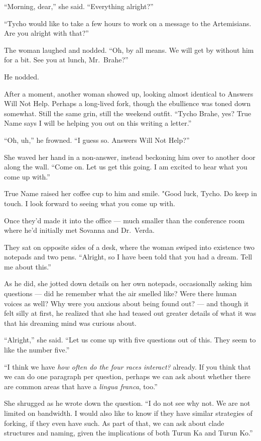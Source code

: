 ``Morning, dear,'' she said. ``Everything alright?''

``Tycho would like to take a few hours to work on a message to the Artemisians. Are you alright with that?''

The woman laughed and nodded. ``Oh, by all means. We will get by without him for a bit. See you at lunch, Mr.~Brahe?''

He nodded.

After a moment, another woman showed up, looking almost identical to Answers Will Not Help. Perhaps a long-lived fork, though the ebullience was toned down somewhat. Still the same grin, still the weekend outfit. ``Tycho Brahe, yes? True Name says I will be helping you out on this writing a letter.''

``Oh, uh,'' he frowned. ``I guess so. Answers Will Not Help?''

She waved her hand in a non-answer, instead beckoning him over to another door along the wall. ``Come on. Let us get this going. I am excited to hear what you come up with.''

True Name raised her coffee cup to him and smile. "Good luck, Tycho. Do keep in touch. I look forward to seeing what you come up with.

Once they'd made it into the office — much smaller than the conference room where he'd initially met Sovanna and Dr.~Verda.

They sat on opposite sides of a desk, where the woman swiped into existence two notepads and two pens. ``Alright, so I have been told that you had a dream. Tell me about this.''

As he did, she jotted down details on her own notepads, occasionally asking him questions — did he remember what the air smelled like? Were there human voices as well? Why were you anxious about being found out? — and though it felt silly at first, he realized that she had teased out greater details of what it was that his dreaming mind was curious about.

``Alright,'' she said. ``Let us come up with five questions out of this. They seem to like the number five.''

``I think we have \emph{how often do the four races interact?} already. If you think that we can do one paragraph per question, perhaps we can ask about whether there are common areas that have a \emph{lingua franca}, too.''

She shrugged as he wrote down the question. ``I do not see why not. We are not limited on bandwidth. I would also like to know if they have similar strategies of forking, if they even have such. As part of that, we can ask about clade structures and naming, given the implications of both Turun Ka and Turun Ko.''

